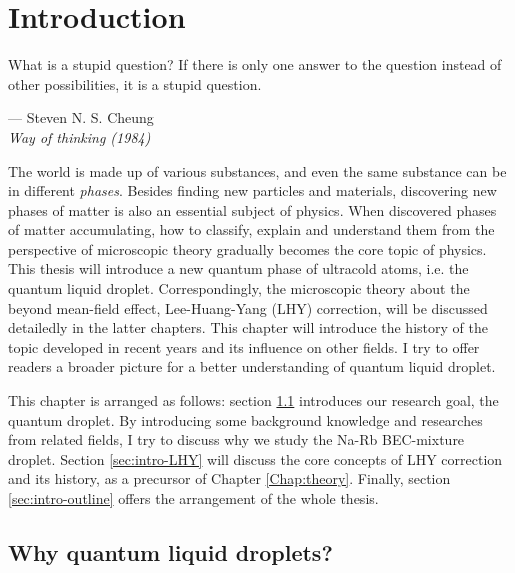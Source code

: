 \chapter{Introduction}
\label{Chap:intro}

\setlength{\unitlength}{1pt}
\setlength{\epigraphwidth}{11cm}
\epigraph{What is a stupid question? If there is only one answer to the question instead of other possibilities, it is a stupid question. \cite{cheung1988}}{--- Steven N. S. Cheung\\ \textit{Way of thinking (1984)}}

The world is made up of various substances, and even the same substance can be in different \textit{phases}. Besides finding new particles and materials, discovering new phases of matter is also an essential subject of physics. When discovered phases of matter accumulating, how to classify, explain and understand them from the perspective of microscopic theory gradually becomes the core topic of physics. This thesis will introduce a new quantum phase of ultracold atoms, i.e. the quantum liquid droplet. Correspondingly, the microscopic theory about the beyond mean-field effect, Lee-Huang-Yang (LHY) correction\cite{lee1957}, will be discussed detailedly in the latter chapters. This chapter will introduce the history of the topic developed in recent years and its influence on other fields. I try to offer readers a broader picture for a better understanding of quantum liquid droplet.

This chapter is arranged as follows: section \ref{sec:intro-background} introduces our research goal, the quantum droplet. By introducing some background knowledge and researches from related fields, I try to discuss why we study the Na-Rb BEC-mixture droplet. Section \ref{sec:intro-LHY} will discuss the core concepts of LHY correction and its history, as a precursor of Chapter \ref{Chap:theory}. Finally, section \ref{sec:intro-outline} offers the arrangement of the whole thesis.

\section{Why quantum liquid droplets?}
\label{sec:intro-background}

